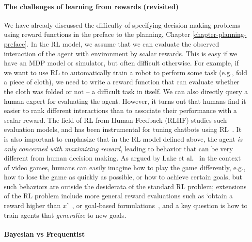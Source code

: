 \paragraph{The challenges of learning from rewards (revisited)}
We have already discussed the difficulty of specifying decision making problems using reward functions in the preface to the planning, Chapter \ref{chapter-planning-preface}. In the RL model, we assume that we can evaluate the observed interaction of the agent with environment by scalar rewards. This is easy if we have an MDP model or simulator, but often difficult otherwise. For example, if we want to use RL to automatically train a robot to perform some task (e.g., fold a piece of cloth), we need to write a reward function that can evaluate whether the cloth was folded or not -- a difficult task in itself. We can also directly query a human expert for evaluating the agent. However, it turns out that humans find it easier to rank different interactions than to associate their performance with a scalar reward. The field of RL from Human Feedback (RLHF) studies such evaluation models, and has been instrumental for tuning chatbots using RL~\cite{ouyang2022training}. It is also important to emphasize that in the RL model defined above, the agent \textit{is only concerned with maximizing reward}, leading to behavior that can be very different from human decision making. As argued by Lake et al.~\cite{lake2017building} in the context of video games, humans can easily imagine how to play the game differently, e.g., how to lose the game as quickly as possible, or how to achieve certain goals, but such behaviors are outside the desiderata of the standard RL problem; extensions of the RL problem include more general reward evaluations such as `obtain a reward higher than $x$'~\cite{srivastava2019training,chen2021decision}, or goal-based formulations~\cite{kaelbling1993learning}, and a key question is how to train agents that \textit{generalize} to new goals.

\paragraph{Bayesian vs Frequentist}

